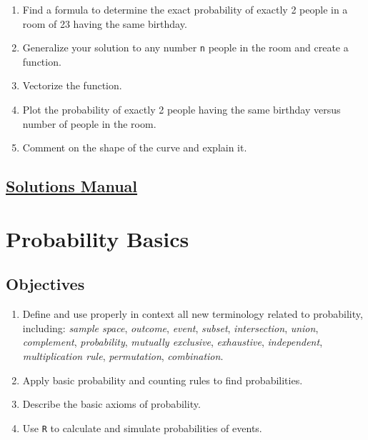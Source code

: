 \documentclass[
  letterpaper,
  DIV=11,
  numbers=noendperiod]{scrreprt}
\providecommand{\tightlist}{%
  \setlength{\itemsep}{0pt}\setlength{\parskip}{0pt}}\usepackage{longtable,booktabs,array}
\begin{document}
\begin{enumerate}
\def\labelenumi{\alph{enumi}.}
\tightlist
\item
  Find a formula to determine the exact probability of exactly 2 people
  in a room of 23 having the same birthday.\\
\item
  Generalize your solution to any number \texttt{n} people in the room
  and create a function.\\
\item
  Vectorize the function.\\
\item
  Plot the probability of exactly 2 people having the same birthday
  versus number of people in the room.\\
\item
  Comment on the shape of the curve and explain it.
\end{enumerate}

\section*{\texorpdfstring{\href{https://ds-usafa.github.io/CPS-Solutions-Manual/CS2.html}{Solutions
Manual}}{Solutions Manual}}\label{solutions-manual-7}


\chapter{Probability Basics}\label{PROBRULES}

\newcommand{\E}{\mbox{E}}
\newcommand{\Var}{\mbox{Var}}
\newcommand{\Cov}{\mbox{Cov}}
\newcommand{\Prob}{\mbox{P}}
\newcommand*\diff{\mathop{}\!\mathrm{d}}

\section{Objectives}\label{objectives-8}

\begin{enumerate}
\def\labelenumi{\arabic{enumi})}
\item
  Define and use properly in context all new terminology related to
  probability, including: \emph{sample space}, \emph{outcome},
  \emph{event}, \emph{subset}, \emph{intersection}, \emph{union},
  \emph{complement}, \emph{probability}, \emph{mutually exclusive},
  \emph{exhaustive}, \emph{independent}, \emph{multiplication rule},
  \emph{permutation}, \emph{combination}.
\item
  Apply basic probability and counting rules to find probabilities.
\item
  Describe the basic axioms of probability.
\item
  Use \texttt{R} to calculate and simulate probabilities of events.
\end{enumerate}
\end{document}
